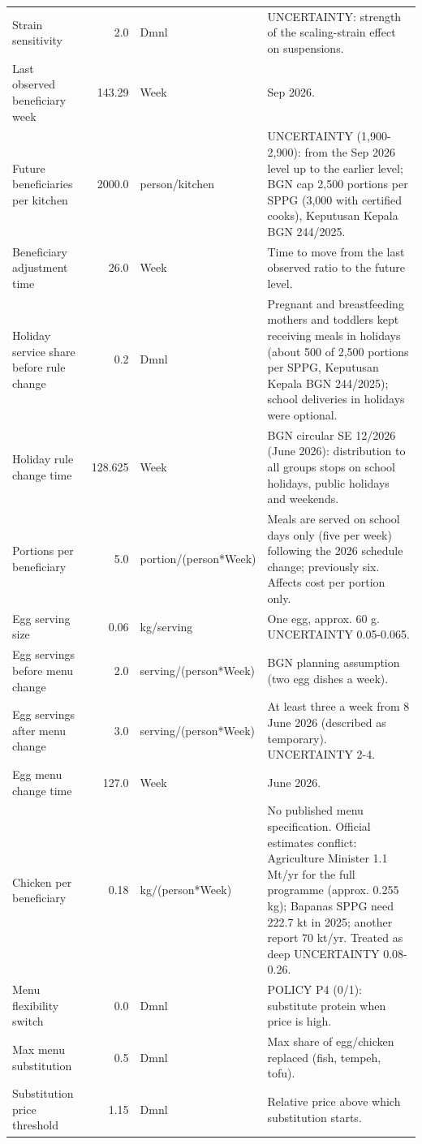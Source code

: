 \documentclass[10pt,twocolumn,a4paper]{article}
\begin{document}
\begin{longtable}{>{\raggedright\arraybackslash}p{4.2cm}r>{\raggedright\arraybackslash}p{2.4cm}>{\raggedright\arraybackslash}p{7.2cm}}
Strain sensitivity & 2.0 & Dmnl & UNCERTAINTY: strength of the scaling-strain effect on suspensions. \\
Last observed beneficiary week & 143.29 & Week & 30 Sep 2026. \\
Future beneficiaries per kitchen & 2000.0 & person/kitchen & UNCERTAINTY (1,900-2,900): from the Sep 2026 level up to the earlier level; BGN cap 2,500 portions per SPPG (3,000 with certified cooks), Keputusan Kepala BGN 244/2025. \\
Beneficiary adjustment time & 26.0 & Week & Time to move from the last observed ratio to the future level. \\
Holiday service share before rule change & 0.2 & Dmnl & Pregnant and breastfeeding mothers and toddlers kept receiving meals in holidays (about 500 of 2,500 portions per SPPG, Keputusan Kepala BGN 244/2025); school deliveries in holidays were optional. \\
Holiday rule change time & 128.625 & Week & BGN circular SE 12/2026 (June 2026): distribution to all groups stops on school holidays, public holidays and weekends. \\
Portions per beneficiary & 5.0 & portion/(person*Week) & Meals are served on school days only (five per week) following the 2026 schedule change; previously six. Affects cost per portion only. \\
Egg serving size & 0.06 & kg/serving & One egg, approx. 60 g. UNCERTAINTY 0.05-0.065. \\
Egg servings before menu change & 2.0 & serving/(person*Week) & BGN planning assumption (two egg dishes a week). \\
Egg servings after menu change & 3.0 & serving/(person*Week) & At least three a week from 8 June 2026 (described as temporary). UNCERTAINTY 2-4. \\
Egg menu change time & 127.0 & Week & 8 June 2026. \\
Chicken per beneficiary & 0.18 & kg/(person*Week) & No published menu specification. Official estimates conflict: Agriculture Minister 1.1 Mt/yr for the full programme (approx. 0.255 kg); Bapanas SPPG need 222.7 kt in 2025; another report 70 kt/yr. Treated as deep UNCERTAINTY 0.08-0.26. \\
Menu flexibility switch & 0.0 & Dmnl & POLICY P4 (0/1): substitute protein when price is high. \\
Max menu substitution & 0.5 & Dmnl & Max share of egg/chicken replaced (fish, tempeh, tofu). \\
Substitution price threshold & 1.15 & Dmnl & Relative price above which substitution starts. \\

\end{longtable}
\end{document}
